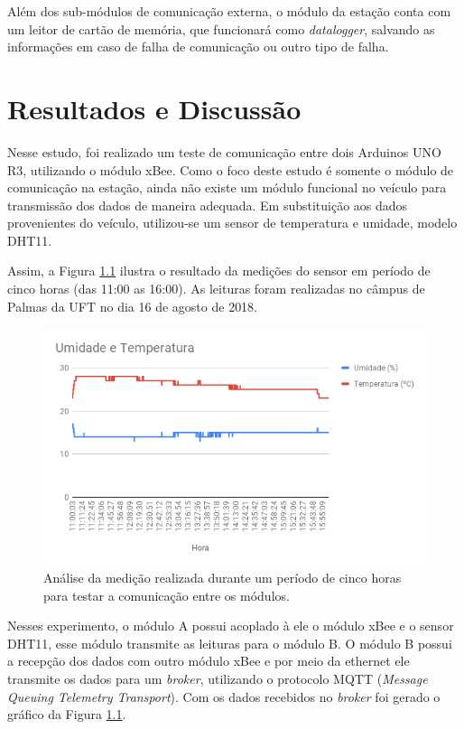 \documentclass[12pt]{uftpibicsic2020}
\begin{document}
Além dos sub-módulos de comunicação externa, o módulo da estação conta com um leitor de cartão de memória, que funcionará como \textit{datalogger}, salvando as informações em caso de falha de comunicação ou outro tipo de falha.

\chapter{Resultados e Discussão}\vskip -12pt

Nesse estudo, foi realizado um teste de comunicação entre dois Arduinos UNO R3, utilizando o módulo xBee. Como o foco deste estudo é somente o módulo de comunicação na estação, ainda não existe um módulo funcional no veículo para transmissão dos dados de maneira adequada. Em substituição aos dados provenientes do veículo, utilizou-se um sensor de temperatura e umidade, modelo DHT11.

Assim, a Figura \ref{fig:umtemp} ilustra o resultado da medições do sensor em período de cinco horas (das 11:00 as 16:00). As leituras foram realizadas no câmpus de Palmas da UFT no dia 16 de agosto de 2018.

\begin{figure}[!h]
\centering
\includegraphics[width=12cm]{Umidade_e_Temperatura_.png}
\caption{Análise da medição realizada durante um período de cinco horas para testar a comunicação entre os módulos.}
\label{fig:umtemp}
\end{figure}

Nesses experimento, o módulo A possui acoplado à ele o módulo xBee e o sensor DHT11, esse módulo transmite as leituras para o módulo B. O módulo B possui a recepção dos dados com outro módulo xBee e por meio da ethernet ele transmite os dados para um \textit{broker}, utilizando o protocolo MQTT (\textit{Message Queuing Telemetry Transport}). Com os dados recebidos no \textit{broker} foi gerado o gráfico da Figura \ref{fig:umtemp}.
\end{document}

